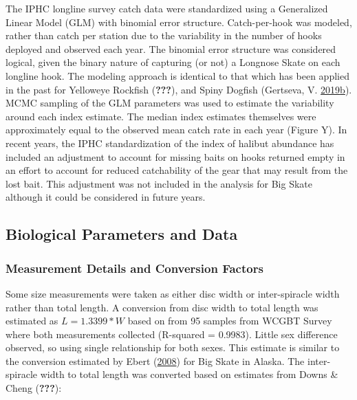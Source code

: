 \documentclass[12pt,]{article}
\begin{document}
The IPHC longline survey catch data were standardized using a
Generalized Linear Model (GLM) with binomial error structure.
Catch-per-hook was modeled, rather than catch per station due to the
variability in the number of hooks deployed and observed each year. The
binomial error structure was considered logical, given the binary nature
of capturing (or not) a Longnose Skate on each longline hook. The
modeling approach is identical to that which has been applied in the
past for Yelloweye Rockfish ({\textbf{???}}), and Spiny Dogfish
(Gertseva, V.
\protect\hyperlink{ref-Gertseva2011}{2019}\protect\hyperlink{ref-Gertseva2011}{b}).
MCMC sampling of the GLM parameters was used to estimate the variability
around each index estimate. The median index estimates themselves were
approximately equal to the observed mean catch rate in each year (Figure
Y). In recent years, the IPHC standardization of the index of halibut
abundance has included an adjustment to account for missing baits on
hooks returned empty in an effort to account for reduced catchability of
the gear that may result from the lost bait. This adjustment was not
included in the analysis for Big Skate although it could be considered
in future years. \newpage

\hypertarget{biological-parameters-and-data}{%
\subsection{Biological Parameters and
Data}\label{biological-parameters-and-data}}

\hypertarget{measurement-details-and-conversion-factors}{%
\subsubsection{Measurement Details and Conversion
Factors}\label{measurement-details-and-conversion-factors}}

Some size measurements were taken as either disc width or inter-spiracle
width rather than total length. A conversion from disc width to total
length was estimated as \(L = 1.3399 * W\) based on from 95 samples from
WCGBT Survey where both measurements collected (R-squared = 0.9983).
Little sex difference observed, so using single relationship for both
sexes. This estimate is similar to the conversion estimated by Ebert
(\protect\hyperlink{ref-Ebert2008}{2008}) for Big Skate in Alaska. The
inter-spiracle width to total length was converted based on estimates
from Downs \& Cheng ({\textbf{???}}):
\end{document}
